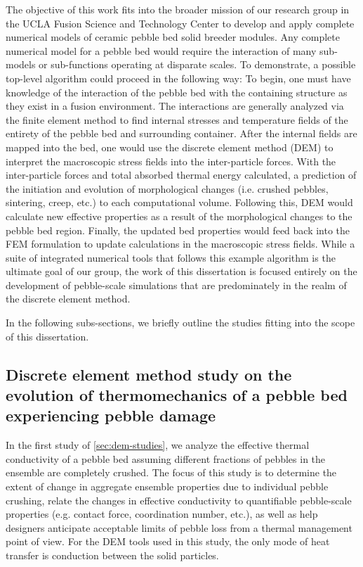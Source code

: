 The objective of this work fits into the broader mission of our research group in the UCLA Fusion Science and Technology Center to develop and apply complete numerical models of ceramic pebble bed solid breeder modules. Any complete numerical model for a pebble bed would require the interaction of many sub-models or sub-functions operating at disparate scales. To demonstrate, a possible top-level algorithm could proceed in the following way: To begin, one must have knowledge of the interaction of the pebble bed with the containing structure as they exist in a fusion environment. The interactions are generally analyzed via the finite element method to find internal stresses and temperature fields of the entirety of the pebble bed and surrounding container. After the internal fields are mapped into the bed, one would use the discrete element method (DEM) to interpret the macroscopic stress fields into the inter-particle forces. With the inter-particle forces and total absorbed thermal energy calculated, a prediction of the initiation and evolution of morphological changes (i.e. crushed pebbles, sintering, creep, etc.) to each computational volume. Following this, DEM would calculate new effective properties as a result of the morphological changes to the pebble bed region. Finally, the updated bed properties would feed back into the FEM formulation to update calculations in the macroscopic stress fields. While a suite of integrated numerical tools that follows this example algorithm is the ultimate goal of our group, the work of this dissertation is focused entirely on the development of pebble-scale simulations that are predominately in the realm of the discrete element method.

In the following subs-sections, we briefly outline the studies fitting into the scope of this dissertation. 


\subsection*{Discrete element method study on the evolution of thermomechanics of a pebble bed experiencing pebble damage}
In the first study of \cref{sec:dem-studies}, we analyze the effective thermal conductivity of a pebble bed assuming different fractions of pebbles in the ensemble are completely crushed. The focus of this study is to determine the extent of change in aggregate ensemble properties due to individual pebble crushing, relate the changes in effective conductivity to quantifiable pebble-scale properties (e.g. contact force, coordination number, etc.), as well as help designers anticipate acceptable limits of pebble loss from a thermal management point of view. For the DEM tools used in this study, the only mode of heat transfer is conduction between the solid particles. 


